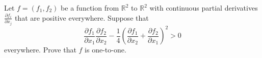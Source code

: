 Let $f = (f_1, f_2)$ be a function from $\mathbb{R}^2$ to $\mathbb{R}^2$ with continuous partial derivatives
$\frac{\partial f_i}{\partial x_j}$ that are positive everywhere. Suppose that
\[
\frac{\partial f_1}{\partial x_1} \frac{\partial f_2}{\partial x_2} - \frac{1}{4} \left( \frac{\partial f_1}{\partial x_2}  + \frac{\partial f_2}{\partial x_1} \right)^2 > 0
\]
everywhere. Prove that $f$ is one-to-one.
